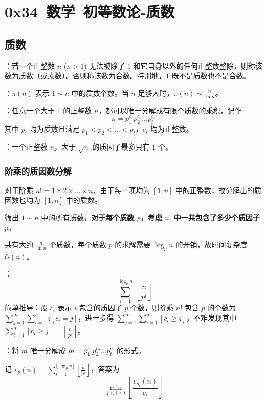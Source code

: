 \section{0x34\ 数学\ 初等数论-质数}
\label{sec:0x34a}

\subsection{质数}

：若一个正整数 $n$ ($n > 1$) 无法被除了 $1$ 和它自身以外的任何正整数整除，则称该数为质数（或素数）。否则称该数为合数。特别地，$1$ 既不是质数也不是合数。

：$\pi(n)$ 表示 $1 \sim n$ 中的质数个数。当 $n$ 足够大时，$\pi(n) \sim \frac{n}{\ln n}$。

：任意一个大于 $1$ 的正整数 $n$，都可以唯一分解成有限个质数的乘积，记作
\[
n = p_1^{c_1}p_2^{c_2}\dots p_t^{c_t}
\]
其中 $p_i$ 均为质数且满足 $p_1 < p_2 < \dots < p_t$，$c_i$ 均为正整数。

：一个正整数 $n$，大于 $\sqrt{n}$ 的质因子最多只有 $1$ 个。

\subsubsection{阶乘的质因数分解}

对于阶乘 $n! = 1 \times 2 \times \dots \times n$，由于每一项均为 $[1, n]$ 中的正整数，故分解出的质因数也均为 $[1, n]$ 中的质数。

筛出 $1 \sim n$ 中的所有质数，\textbf{对于每个质数 $p$，考虑 $n!$ 中一共包含了多少个质因子 $p$}。

共有大约 $\frac{n}{\ln n}$ 个质数，每个质数 $p$ 的求解需要 $\log_p n$ 的开销，故时间复杂度 $\mathcal{O}(n)$。

：
\[
\sum_{i = 1}^{\lfloor \log_p n \rfloor} \left\lfloor \frac{n}{p^i} \right\rfloor
\]
简单推导：设 $c_i$ 表示 $i$ 包含的质因子 $p$ 个数，则阶乘 $n!$ 包含 $p$ 的个数为 $\sum_{j = 1}^{\infty} \sum_{i = 1}^n j[c_i = j]$，进一步得 $\sum_{j = 1}^{\infty}\sum_{i = 1}^n [c_i \geq j]$，不难发现其中 $\sum_{i = 1}^n [c_i \geq j] = \left\lfloor \frac{n}{p^j} \right\rfloor$。

：将 $m$ 唯一分解成 $m = p_1^{c_1}p_2^{c_2}\dots p_t^{c_t}$ 的形式。

记 $v_p(n) = \sum_{i = 1}^{\lfloor \log_p n \rfloor} \left\lfloor \frac{n}{p^i} \right\rfloor$，答案为
\[
\min_{1 \leq i \leq t} \left\lfloor \frac{v_{p_i}(n)}{c_i} \right\rfloor
\]

